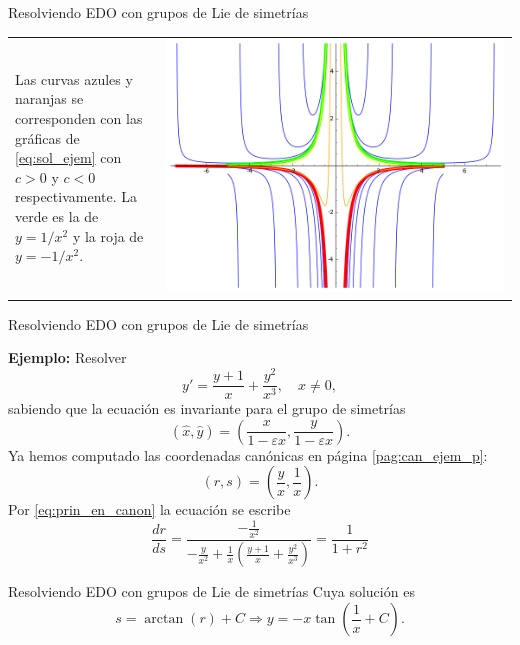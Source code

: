 \documentclass[handout,hyperref={colorlinks=true}]{beamer}
\renewcommand{\epsilon}{\varepsilon}
\begin{document}
\begin{frame}{Resolviendo EDO con grupos de Lie de simetrías}

\begin{tabular}{m{0.3\linewidth} >{\centering\arraybackslash}m{0.7\linewidth} }
Las curvas azules y naranjas se corresponden con las gráficas de \eqref{eq:sol_ejem} con $c>0$ y $c<0$ respectivamente. La verde es la de $y=1/x^2$ y la roja de $y=-1/x^2$.
&
\includegraphics[scale=.4]{imagenes/SolGrup.png}
\end{tabular}
\end{frame}



\begin{frame}{Resolviendo EDO con grupos de Lie de simetrías}



\onslide<+->\textbf{Ejemplo:} Resolver 
\[y'=\frac{y+1}{x}+\frac{y^2}{x^3},\quad x\neq 0,\]
sabiendo que la ecuación es invariante para el grupo de simetrías
\[(\hat{x},\hat{y})=(\frac{x}{1-\epsilon x},\frac{y}{1-\epsilon x}   ).\]
Ya hemos computado las coordenadas canónicas en página \ref{pag:can_ejem_p}:
\[(r,s)=\left(\frac{y}{x},\frac{1}{x}\right).\]
Por \eqref{eq:prin_en_canon} la ecuación se escribe
\[\frac{dr}{ds}=\frac{-\frac{1}{x^2} }{-\frac{y}{x^2}+\frac{1}{x}\left(
\frac{y+1}{x}+\frac{y^2}{x^3}\right)}=\frac{1}{1+r^2}\]

\end{frame}



\begin{frame}{Resolviendo EDO con grupos de Lie de simetrías}
Cuya solución es 
\[s=\arctan(r)+C\Rightarrow y=-x\tan\left(\frac{1}{x}+C\right).\]
\end{frame}
\end{document}

